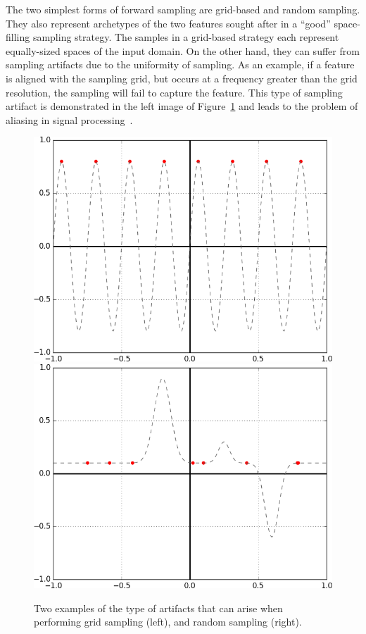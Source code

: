 The two simplest forms of forward sampling are grid-based and random sampling.
%
They also represent archetypes of the two features sought after in a ``good'' space-filling sampling strategy.
%
The samples in a grid-based strategy each represent equally-sized spaces of the input domain.
%
On the other hand, they can suffer from sampling artifacts due to the uniformity of sampling.
%
As an example, if a feature is aligned with the sampling grid, but occurs at a frequency greater than the grid resolution, the sampling will fail to capture the feature.
%
This type of sampling artifact is demonstrated in the left image of Figure~\ref{fig:samplingArtifacts} and leads to the problem of aliasing in signal processing~\cite{Crow1977}.
%

\begin{figure}[t]
  \centering
  \includegraphics[width=.45\textwidth]{figs/chap3/sampledSine}\qquad
  \includegraphics[width=.45\textwidth]{figs/chap3/sampledGaussian}
  \caption[1D Sampling Artifacts]{Two examples of the type of artifacts that can
  arise when performing grid sampling (left), and random sampling (right).}
  \label{fig:samplingArtifacts}
\end{figure}

